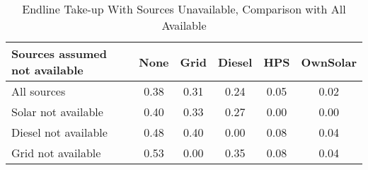 \begin{table}[htbp]\centering
\caption{Endline Take-up With Sources Unavailable, Comparison with All Available\label {tab1}}
\begin{tabular}{l*{5}{c}}
\toprule
Sources assumed not available            &        None&        Grid&      Diesel&         HPS&    OwnSolar\\
\midrule
All sources &        \cellcolor{yellow}0.38&        0.31&        0.24&        0.05&        0.02\\
Solar not available&       \cellcolor{yellow} 0.40&        0.33&        0.27&        0.00&        0.00\\
Diesel not available&        0.48&        0.40&        0.00&        0.08&        0.04\\
Grid not available&        0.53&        0.00&        0.35&        0.08&        0.04\\
\bottomrule
\end{tabular}
\end{table}
